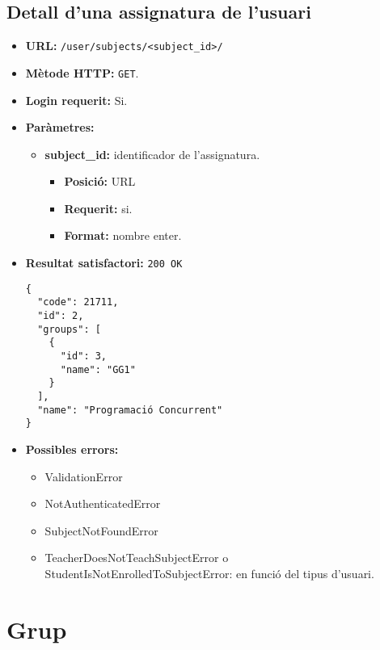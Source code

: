 \subsection{Detall d'una assignatura de l'usuari}
\begin{itemize}
\item \textbf{\ac{URL}:} \texttt{/user/subjects/<subject\_id>/}
\item \textbf{Mètode \ac{HTTP}: } \texttt{GET}.
\item \textbf{Login requerit:} Si.
\item \textbf{Paràmetres:}
	\begin{itemize}
		\item \textbf{subject\_id:} identificador de l'assignatura.
		\begin{itemize}
			\item \textbf{Posició:} \ac{URL}
			\item \textbf{Requerit:} si.
			\item \textbf{Format:} nombre enter.
		\end{itemize}
	\end{itemize}

\item \textbf{Resultat satisfactori:} \texttt{200 OK}
	\begin{verbatim}
{
  "code": 21711,
  "id": 2,
  "groups": [
    {
      "id": 3,
      "name": "GG1"
    }
  ],
  "name": "Programació Concurrent"
}
	\end{verbatim}
	
	
\item \textbf{Possibles errors:}
	\begin{itemize}
		\item ValidationError
		\item NotAuthenticatedError
		\item SubjectNotFoundError
		\item TeacherDoesNotTeachSubjectError o StudentIsNotEnrolledToSubjectError: en funció del tipus d'usuari.
	\end{itemize}
\end{itemize}


\section{Grup}

